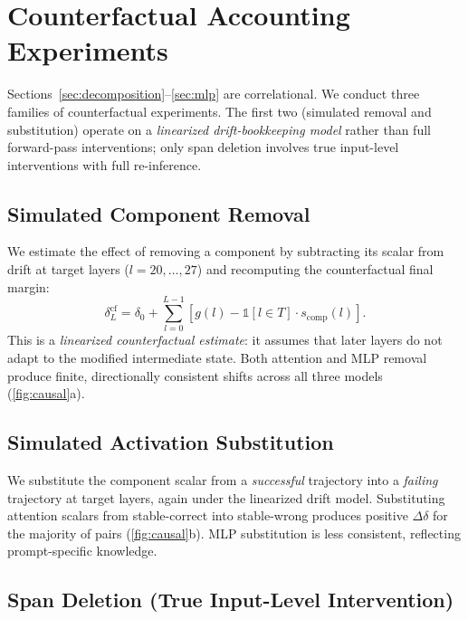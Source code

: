 \documentclass{article}
\begin{document}
\section{Counterfactual Accounting Experiments}
\label{sec:causal}

Sections~\ref{sec:decomposition}--\ref{sec:mlp} are correlational.  We conduct three families of counterfactual experiments.  The first two (simulated removal and substitution) operate on a \emph{linearized drift-bookkeeping model} rather than full forward-pass interventions; only span deletion involves true input-level interventions with full re-inference.

\subsection{Simulated Component Removal}

We estimate the effect of removing a component by subtracting its scalar from drift at target layers ($l = 20,\ldots,27$) and recomputing the counterfactual final margin:
\begin{equation}
  \delta^{\mathrm{cf}}_L = \delta_0 + \sum_{l=0}^{L-1}\! \left[g(l) - \mathbb{1}[l \in T]\cdot s_{\mathrm{comp}}(l)\right]\!.
  \label{eq:ablation}
\end{equation}
This is a \emph{linearized counterfactual estimate}: it assumes that later layers do not adapt to the modified intermediate state.  Both attention and MLP removal produce finite, directionally consistent shifts across all three models (\cref{fig:causal}a).

\subsection{Simulated Activation Substitution}

We substitute the component scalar from a \emph{successful} trajectory into a \emph{failing} trajectory at target layers, again under the linearized drift model.  Substituting attention scalars from stable-correct into stable-wrong produces positive $\Delta\delta$ for the majority of pairs (\cref{fig:causal}b).  MLP substitution is less consistent, reflecting prompt-specific knowledge.

\subsection{Span Deletion (True Input-Level Intervention)}
\end{document}
